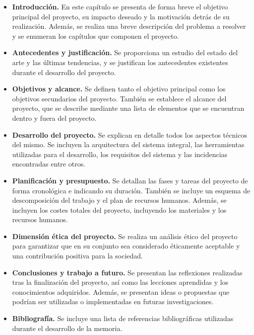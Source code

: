 \begin{itemize}
    \item \textbf{Introducción.} En este capítulo se presenta de forma breve el objetivo 
    principal del proyecto, su impacto deseado y la motivación detrás de su realización. 
    Además, se realiza una  breve descripción del problema a resolver y se enumeran
    los capítulos que componen el proyecto.
    \item \textbf{Antecedentes y justificación.} Se proporciona un estudio del estado del 
    arte y las últimas tendencias, y se justifican los antecedentes existentes durante el 
    desarrollo del proyecto.
    \item \textbf{Objetivos y alcance.} Se definen tanto el objetivo 
    principal como los objetivos secundarios del proyecto. También se establece el alcance 
    del proyecto, que se describe mediante una lista de elementos que se encuentran 
    dentro y fuera del proyecto.
    \item \textbf{Desarrollo del proyecto.} Se explican en detalle todos los aspectos técnicos del mismo. 
    Se incluyen la arquitectura del sistema integral, las herramientas utilizadas para el desarrollo, 
    los requisitos del sistema y las incidencias encontradas entre otros.
    \item \textbf{Planificación y presupuesto.} Se detallan las fases y tareas del proyecto de forma
    cronológica e indicando su duración. También se incluye un esquema de descomposición 
    del trabajo y el plan de recursos humanos. Además, se incluyen los costes totales del proyecto, 
    incluyendo los materiales y los recursos humanos.
    \item \textbf{Dimensión ética del proyecto.} Se realiza un análisis ético del proyecto 
    para garantizar que en su conjunto sea considerado éticamente aceptable y una contribución positiva 
    para la sociedad.
    \item \textbf{Conclusiones y trabajo a futuro.} Se presentan las reflexiones realizadas 
    tras la finalización del proyecto, así como las lecciones aprendidas y los conocimientos 
    adquiridos. Además, se presentan ideas o propuestas que podrían ser utilizadas o implementadas 
    en futuras investigaciones.
    \item \textbf{Bibliografía.} Se incluye una lista de referencias bibliográficas utilizadas
    durante el de\-sarro\-llo de la memoria.
\end{itemize}



\pagebreak